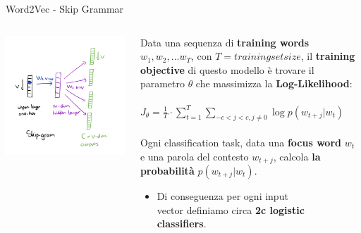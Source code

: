 \documentclass[british]{beamer}
\begin{document}
\begin{frame}{Word2Vec - Skip Grammar}
	\begin{columns}
		\begin{column}{0.4\textwidth}
			\includegraphics[width=1.1\linewidth,height=1.4\textwidth]{./Imgs/skip.png}
		\end{column}
		\begin{column}{0.6\textwidth}
			Data una sequenza di \textbf{training words} \(w_1, w_2, ... w_T\), con \(T = trainingsetsize\), il \textbf{training objective} di questo modello \`{e} trovare il parametro \(\theta\) che massimizza la \textbf{Log-Likelihood}:
			\\~\\
			\(J_{\theta} =	\frac{1}{T}\cdot\sum_{t=1}^{T}\sum_{-c<j<c,j\neq0}\log p(w_{t+j}|w_{t})\)
			\\~\\
			Ogni classification task, data una \textbf{focus word} \(w_t\) e una parola del contesto \(w_{t+j}\), calcola \textbf{la probabilit\`{a}} \(p(w_{t+j}|w_{t})\).
			\begin{itemize}
				\item Di conseguenza per ogni input \\vector definiamo circa \textbf{2c logistic\\ classifiers}.
			\end{itemize}
		\end{column}
	\end{columns}
\end{frame}
\end{document}
